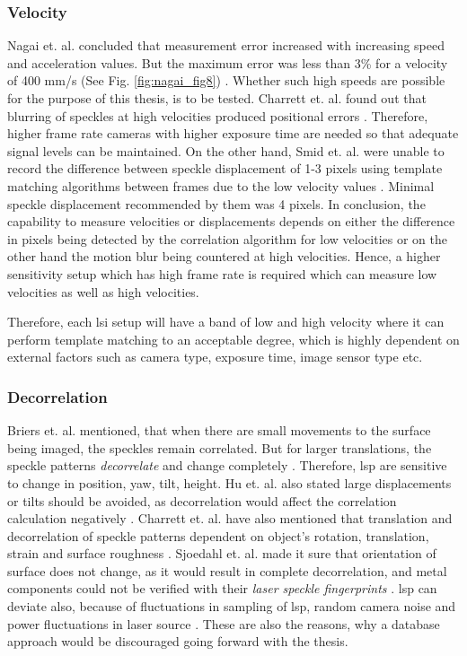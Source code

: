     
    \subsubsection*{Velocity}
    Nagai et. al. concluded that measurement error increased with increasing speed and acceleration values. But the maximum error was less than 3\% for a velocity of 400 mm/s (See Fig. \ref{fig:nagai_fig8}) \cite{nagai}. Whether such high speeds are possible for the purpose of this thesis, is to be tested. Charrett et. al. found out that blurring of speckles at high velocities produced positional errors \cite{charrett_2018}. Therefore, higher frame rate cameras with higher exposure time are needed so that adequate signal levels can be maintained. On the other hand, Smid et. al. were unable to record the difference between speckle displacement of 1-3 pixels using template matching algorithms between frames due to the low velocity values \cite{smid_2007}. Minimal speckle displacement recommended by them was 4 pixels. In conclusion, the capability to measure velocities or displacements depends on either the difference in pixels being detected by the correlation algorithm for low velocities or on the other hand the motion blur being countered at high velocities. Hence, a higher sensitivity setup which has high frame rate is required which can measure low velocities as well as high velocities.

    \vspace{5mm}
    \noindent Therefore, each \gls{lsi} setup will have a band of low and high velocity where it can perform template matching to an acceptable degree, which is highly dependent on external factors such as camera type, exposure time, image sensor type etc.

    
    \subsubsection*{Decorrelation}\label{subsubsection:decorrelation}
    Briers et. al. mentioned, that when there are small movements to the surface being imaged, the speckles remain correlated. But for larger translations, the speckle patterns \emph{decorrelate} and change completely \cite{briers}. Therefore, \gls{lsp} are sensitive to change in position, yaw, tilt, height. Hu et. al. also stated large displacements or tilts should be avoided, as decorrelation would affect the correlation calculation negatively \cite{hu}. Charrett et. al. have also mentioned that translation and decorrelation of speckle patterns dependent on object's rotation, translation, strain and surface roughness \cite{charrett_2018}. Sjoedahl et. al. made it sure that orientation of surface does not change, as it would result in complete decorrelation, and metal components could not be verified with their \emph{laser speckle fingerprints} \cite{sjoedahl}. \Gls{lsp} can deviate also, because of fluctuations in sampling of \Gls{lsp}, random camera noise and power fluctuations in laser source \cite{charrett_2019}. These are also the reasons, why a database approach would be discouraged going forward with the thesis.


